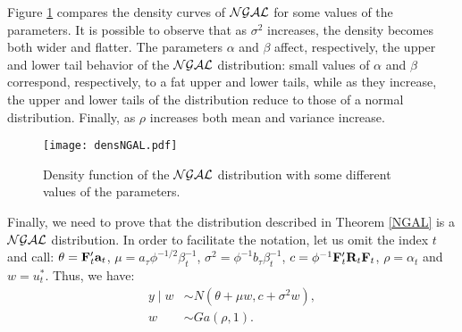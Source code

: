 \documentclass[12pt,a4paper]{article}\usepackage[]{graphicx}\usepackage[]{color}\usepackage{subfigure}
\begin{document}

Figure \ref{densNGAL} compares the density curves of $\cal{NGAL}$ for some values of the parameters.
It is possible to observe that as $\sigma^2$ increases, the density becomes both wider and flatter. The parameters $\alpha$ and $\beta$ affect, 
respectively, the upper and lower tail behavior of the $\cal{NGAL}$ distribution: small values of $\alpha$ and $\beta$ correspond, respectively, to a fat upper and lower tails, while as they increase, the upper and lower tails of the distribution reduce to those of a normal distribution. 
Finally, as $\rho$ increases both mean and variance increase. 
\begin{figure}[!hbt]
\begin{center}
\texttt{[image: densNGAL.pdf]}
\vspace{-0.6 cm}\caption{Density function of the $\cal{NGAL}$ distribution with some different values of the parameters.}
\label{densNGAL}
\end{center}
\end{figure}

Finally, we need to prove that the distribution described in Theorem \ref{NGAL} is a $\cal{NGAL}$ distribution. In order to facilitate the notation, let us omit the index $t$ and call: $\theta={\bf F}_t'{\bf a}_t$, $\mu=a_{\tau}\phi^{-1/2}\beta_t^{-1}$, $\sigma^2=\phi^{-1}b_{\tau}\beta_t^{-1}$, $c=\phi^{-1}{\bf F}_t'{\bf R}_{t}{\bf F}_t$, 
$\rho=\alpha_t$ and $w=u_t^*$. Thus, we have:
\begin{align*}%
  y\mid w & \sim N\left(\theta+\mu w, c+\sigma^2 w\right),\\
  w &\sim Ga(\rho,1).
  \end{align*}
  
\end{document}
